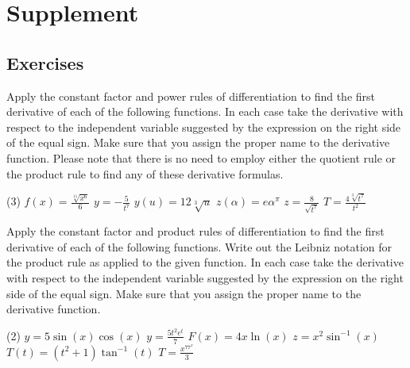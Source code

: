 \documentclass[12pt,]{book}
\theoremstyle{plain}
\theoremstyle{definition}
\numberwithin{equation}{section}
\newcommand{\fe}[2]{#1\mathopen{}\left(#2\right)\mathclose{}}
\begin{document}
\section[Supplement]{Supplement}\label{derivative-formulas-supplementary-exercises}
\typeout{************************************************}
\typeout{************************************************}
\subsection[Exercises]{Exercises}\label{exercises-42}
Apply the constant factor and power rules of differentiation to find the first derivative of each of the following functions.  In each case take the derivative with respect to the independent variable suggested by the expression on the right side of the equal sign.  Make sure that you assign the proper name to the derivative function.  Please note that there is no need to employ either the quotient rule or the product rule to find any of these derivative formulas.%
\par
\begin{exercisegroup}(3)
\exercise[1.]\hypertarget{exercise-401}{\null}\(\fe{f}{x}=\frac{\sqrt[11]{x^6}}{6}\)%
\exercise[2.]\hypertarget{exercise-402}{\null}\(y=-\frac{5}{t^7}\)%
\exercise[3.]\hypertarget{exercise-403}{\null}\(\fe{y}{u}=12\sqrt[3]{u}\)%
\exercise[4.]\hypertarget{exercise-404}{\null}\(\fe{z}{\alpha}=e\alpha^{\pi}\)%
\exercise[5.]\hypertarget{exercise-405}{\null}\(z=\frac{8}{\sqrt{t^7}}\)%
\exercise[6.]\hypertarget{exercise-406}{\null}\(T=\frac{4\sqrt[3]{t^7}}{t^2}\)%
\end{exercisegroup}
\par\smallskip\noindent
Apply the constant factor and product rules of differentiation to find the first derivative of each of the following functions.   Write out the Leibniz notation for the product rule as applied to the given function. In each case take the derivative with respect to the independent variable suggested by the expression on the right side of the equal sign.  Make sure that you assign the proper name to the derivative function.%
\par
\begin{exercisegroup}(2)
\exercise[7.]\hypertarget{exercise-407}{\null}\(y=5\fe{\sin}{x}\fe{\cos}{x}\)%
\exercise[8.]\hypertarget{exercise-408}{\null}\(y=\frac{5t^2e^t}{7}\)%
\exercise[9.]\hypertarget{exercise-409}{\null}\(\fe{F}{x}=4x\fe{\ln}{x}\)%
\exercise[10.]\hypertarget{exercise-410}{\null}\(z=x^2\fe{\sin^{-1}}{x}\)%
\exercise[11.]\hypertarget{exercise-411}{\null}\(\fe{T}{t}=(t^2+1)\fe{\tan^{-1}}{t}\)%
\exercise[12.]\hypertarget{exercise-412}{\null}\(T=\frac{x^77^x}{3}\)%
\end{exercisegroup}
\end{document}
